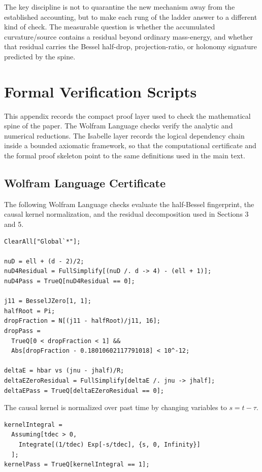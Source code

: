 \documentclass[11pt,a4paper]{article}
\begin{document}
The key discipline is not to quarantine the new mechanism away from the established accounting, but to make each rung of the ladder answer to a different kind of check. The measurable question is whether the accumulated curvature/source contains a residual beyond ordinary mass-energy, and whether that residual carries the Bessel half-drop, projection-ratio, or holonomy signature predicted by the spine.

\appendix
\section{Formal Verification Scripts}
\label{app:formal-verification}

This appendix records the compact proof layer used to check the mathematical spine of the paper. The Wolfram Language checks verify the analytic and numerical reductions. The Isabelle layer records the logical dependency chain inside a bounded axiomatic framework, so that the computational certificate and the formal proof skeleton point to the same definitions used in the main text.

\subsection{Wolfram Language Certificate}

The following Wolfram Language checks evaluate the half-Bessel fingerprint, the causal kernel normalization, and the residual decomposition used in Sections 3 and 5.

\begin{lstlisting}
ClearAll["Global`*"];

nuD = ell + (d - 2)/2;
nuD4Residual = FullSimplify[(nuD /. d -> 4) - (ell + 1)];
nuD4Pass = TrueQ[nuD4Residual == 0];

j11 = BesselJZero[1, 1];
halfRoot = Pi;
dropFraction = N[(j11 - halfRoot)/j11, 16];
dropPass =
  TrueQ[0 < dropFraction < 1] &&
  Abs[dropFraction - 0.18010602117791018] < 10^-12;

deltaE = hbar vs (jnu - jhalf)/R;
deltaEZeroResidual = FullSimplify[deltaE /. jnu -> jhalf];
deltaEPass = TrueQ[deltaEZeroResidual == 0];
\end{lstlisting}

The causal kernel is normalized over past time by changing variables to $s=t-\tau$.

\begin{lstlisting}
kernelIntegral =
  Assuming[tdec > 0,
    Integrate[(1/tdec) Exp[-s/tdec], {s, 0, Infinity}]
  ];
kernelPass = TrueQ[kernelIntegral == 1];
\end{lstlisting}
\end{document}

